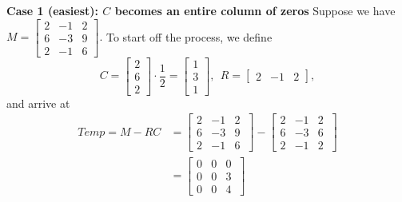 \textbf{Case 1 (easiest): $C$ becomes an entire column of zeros}
Suppose we have $M=\left[ \begin{array}{rrr} 2 & -1 & 2\\
 6 & -3& 9 \\ 2 & -1 & 6  \end{array} \right].$ To start off the process, we define $$C=  \left[\begin{array}{r} 2 \\ 6 \\ 2 \end{array} \right] \cdot \frac{1}{2} =\left[\begin{array}{r} 1 \\ 3 \\ 1 \end{array} \right] ,~~R=\left[\begin{array}{rrr} 2 & -1 & 2 \end{array} \right], $$
and arrive at 
\begin{align*}
    Temp=M-RC &  =  \left[ \begin{array}{rrr} 2 & -1 & 2\\
 6 & -3& 9 \\ 2 & -1 & 6  \end{array}\ \right] -  \left[ \begin{array}{rrr} 2 & -1 & 2\\
 6 & -3& 6 \\ 2 & -1 & 2  \end{array}\ \right]\\
 &=  \left[ \begin{array}{rrr} 0 & 0 & 0\\
 0 & 0& 3 \\0 &0 & 4  \end{array}\ \right]
\end{align*}

